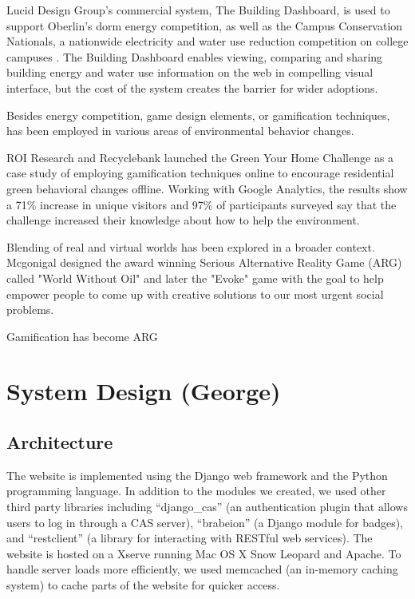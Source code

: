 \documentclass{acm_proc_article-sp}
\begin{document}
Lucid Design Group's commercial system, The Building Dashboard\cite{}, is used to support Oberlin's dorm energy competition, as well as the Campus Conservation Nationals, a nationwide electricity and water use reduction competition on college campuses \cite{}. The Building Dashboard enables viewing, comparing and sharing building energy and water use information on the web in compelling visual interface, but the cost of the system creates the barrier for wider adoptions.

Besides energy competition, game design elements, or gamification techniques, has been employed in various areas of environmental behavior changes. 

ROI Research and Recyclebank launched the Green Your Home Challenge as a case study of employing gamification techniques online to encourage residential green behavioral changes offline\cite{}. Working with Google Analytics, the results show a 71\% increase in unique visitors and 97\% of participants surveyed say that the challenge increased their knowledge about how to help the environment. 

Blending of real and virtual worlds has been explored in a broader context. Mcgonigal designed the award winning Serious Alternative Reality Game (ARG) called "World Without Oil"\cite{} and later the "Evoke"\cite{} game with the goal to help empower people to come up with creative solutions to our most urgent social problems. 

Gamification has become 
ARG

\section{System Design (George)}

\subsection{Architecture}

The website is implemented using the Django web framework and the Python programming language. In addition to the modules we created, we used other third party libraries including ``django\_cas'' (an authentication plugin that allows users to log in through a CAS server), ``brabeion'' (a Django module for badges), and ``restclient'' (a library for interacting with RESTful web services). The website is hosted on a Xserve running Mac OS X Snow Leopard and Apache. To handle server loads more efficiently, we used memcached (an in-memory caching system) to cache parts of the website for quicker access.
\end{document}
